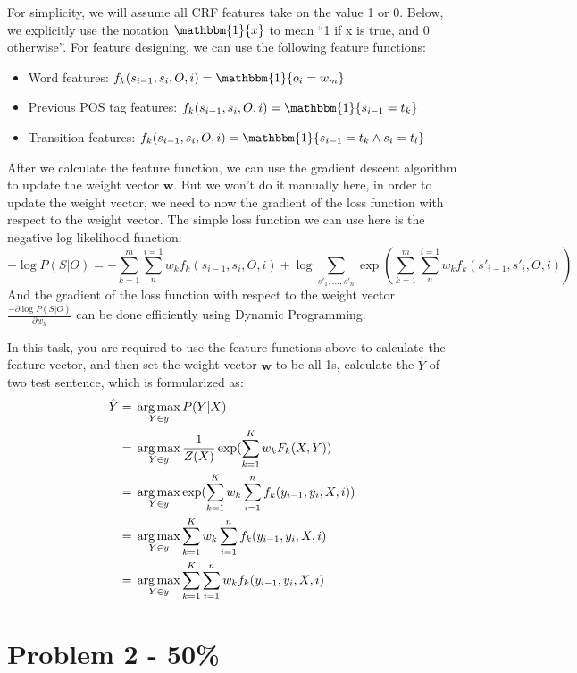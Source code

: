 \documentclass{article}
\begin{document}
For simplicity, we will assume all CRF features take on the value 1 or 0. 
Below, we
explicitly use the notation $\mathbbm{1}\{x\}$ to mean ``1 if x is true, and 0 otherwise''.
For feature designing, we can use the following feature functions:
\begin{itemize}
    \item Word features: $f_{k}(s_{i-1}, s_{i}, O, i) = \mathbbm{1}\{o_{i} = w_{m}\}$
    \item Previous POS tag features: $f_{k}(s_{i-1}, s_{i}, O, i) = \mathbbm{1}\{s_{i-1} = t_{k}\}$
    \item Transition features: $f_{k}(s_{i-1}, s_{i}, O, i) = \mathbbm{1}\{s_{i-1} = t_{k} \land s_{i} = t_{l}\}$
\end{itemize}

After we calculate the feature function, 
we can use the gradient descent algorithm to update the weight vector $\mathbf{w}$.
But we won't do it manually here, in order to update the weight vector,
we need to now the gradient of the loss function with respect to the weight vector.
The simple loss function we can use here is the negative log likelihood function:
$$-\log P(S|O) = -\sum_{k=1}^{m}\sum_{n}^{i=1}w_{k}f_{k}(s_{i-1},s_{i},O,i)+
\log \sum_{s'_{1}, 
\dots,s'_{n} }^{} \exp (\sum_{k=1}^{m}\sum_{n}^{i=1}w_{k}f_{k}(s'_{i-1},s'_{i},O,i))$$
And the gradient of the loss function with respect to the weight vector
$\frac{-\partial \log P(S|O)}{\partial w_{k}} $ can be done efficiently using Dynamic Programming.

In this task, you are required to use the feature functions above to calculate the feature vector,
and then set the weight vector $\mathbf{w}$ to be all 1s,
calculate the $\hat{Y}$ of two test sentence, which is formularized as:
\begin{align}
\hat{Y} &= \sideset{}{}{\arg\max}_{Y \in y}  P(Y|X) \\ &= \sideset{}{}{\arg\max}_{Y \in y} \frac{1}{Z(X)}\exp (\sum_{k = 1}^{K}w_kF_k(X,Y) ) \\ & = \sideset{}{}{\arg\max}_{Y \in y} \exp (\sum_{k = 1}^{K}w_k\sum_{i = 1}^{n}f_k(y_{i-1},y_i,X,i)) \\ & = \sideset{}{}{\arg\max}_{Y \in y} \sum_{k = 1}^{K}w_k\sum_{i = 1}^{n}f_k(y_{i-1},y_i,X,i) \\ & = \sideset{}{}{\arg\max}_{Y \in y} \sum_{k = 1}^{K}\sum_{i = 1}^{n}w_kf_k(y_{i-1},y_i,X,i) 
\end{align}


\section*{Problem 2 - 50\%}
\end{document}
